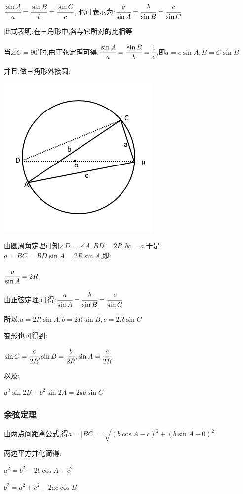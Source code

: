 \documentclass[UTF8,12pt]{ctexbook}
\newcommand{\degree}{^\circ}
\begin{document}
{{{$\cfrac{\sin A}{a} = \cfrac{\sin B}{b} = \cfrac{\sin C}{c}$, 也可表示为:$\cfrac{a}{\sin A} = \cfrac{b}{\sin B} = \cfrac{c}{\sin C}$

此式表明:在三角形中,各{}与它所对{}的比相等

当$\angle C = 90\degree$时,由正弦定理可得:$\cfrac{\sin A}{a} = \cfrac{\sin B}{b} = \cfrac{1}{c}$,即$a = c\sin A,B = C\sin B$

并且,做三角形外接圆:

\includegraphics[scale=0.5]{resources/insideTriangleAndCircleOutSide.png}

由圆周角定理可知$\angle D = \angle A,BD = 2R,bc = a$.于是$a = BC = BD\sin A = 2R\sin A$,即:

$\cfrac{a}{\sin A} = 2R$

由正弦定理,可得:$\cfrac{a}{\sin A} = \cfrac{b}{\sin B} = \cfrac{c}{\sin C}$

所以,$a = 2R\sin A,b = 2R\sin B,c = 2R\sin C$

变形也可得到:

$\sin C = \cfrac{c}{2R},\sin B = \cfrac{b}{2R},\sin A = \cfrac{a}{2R}$

以及:

$a^2\sin2B + b^2\sin2A = 2ab\sin C$
}%

\subsubsection{余弦定理}{
  由两点间距离公式,得$a = |BC| = \sqrt{(b\cos A - c)^2 + (b\sin A - 0)^2}$

  两边平方并化简得:

  $a^2 = b^2 - 2b\cos A + c^2$

  $b^2 = a^2 + c^2 - 2ac\cos B$

}}}
\end{document}
